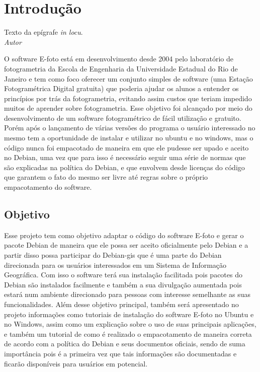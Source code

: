 \chapter*{Introdução}

\begin{epigrafeonline}
\hfill Texto da epígrafe \textit{in locu}.\\
\hspace*{\fill}\textit{Autor}\\
\end{epigrafeonline}
O software E-foto está em desenvolvimento desde 2004 pelo laboratório de fotogrametria da Escola de Engenharia da Universidade Estadual do Rio de Janeiro e tem como foco oferecer um conjunto simples de software (uma Estação Fotogramétrica Digital gratuita) que poderia ajudar os alunos a entender os princípios por trás da fotogrametria, evitando assim custos que teriam impedido muitos de aprender sobre fotogrametria. Esse objetivo foi alcançado por meio do desenvolvimento de um software fotogramétrico de fácil utilização e gratuito. Porém após o lançamento de várias versões do programa o usuário interessado no mesmo tem a oportunidade de instalar e utilizar no ubuntu e no windows, mas o código nunca foi empacotado de maneira em que ele pudesse ser upado e aceito no Debian, uma vez que para isso é necessário seguir uma série de normas que são explicadas na política do Debian, e que envolvem desde licenças do código que garantem o fato do mesmo ser livre até regras sobre o próprio empacotamento do software.

\section*{Objetivo}

Esse projeto tem como objetivo adaptar o código do software E-foto e gerar o pacote Debian de maneira que ele possa ser aceito oficialmente pelo Debian e a partir disso possa participar do Debian-gis que é uma parte do Debian direcionada para os usuários interessados em um Sistema de Informação Geográfica. Com isso o software terá sua instalação facilitada pois pacotes do Debian são instalados facilmente e também a sua divulgação aumentada pois estará num ambiente direcionado para pessoas com interesse semelhante as suas funcionalidades. Além desse objetivo principal, também será apresentado no projeto informações como tutoriais de instalação do software E-foto no Ubuntu e no Windows, assim como um explicação sobre o uso de suas principais aplicações, e também um tutorial de como é realizado o empacotamento de maneira correta de acordo com a política do Debian e seus documentos oficiais, sendo de suma importância pois é a primeira vez que tais informações são documentadas e ficarão disponíveis para usuários em potencial.

